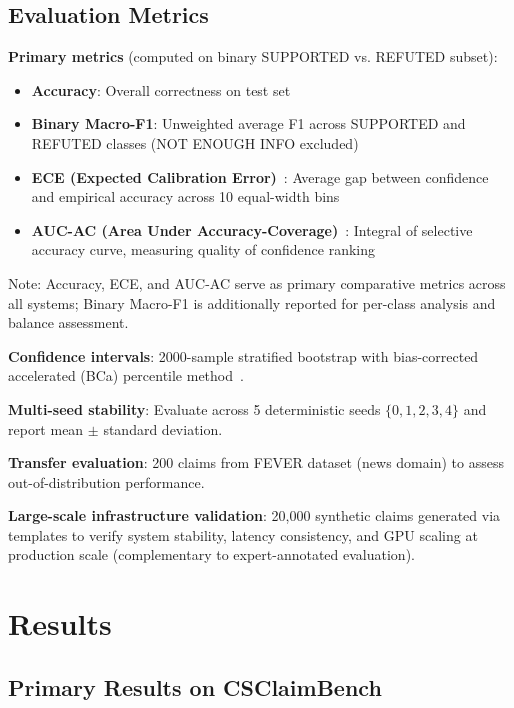 \documentclass[journal]{IEEEtran}
\begin{document}
\subsection{Evaluation Metrics}

\textbf{Primary metrics} (computed on binary SUPPORTED vs. REFUTED subset):
\begin{itemize}
    \item \textbf{Accuracy}: Overall correctness on test set
    \item \textbf{Binary Macro-F1}: Unweighted average F1 across SUPPORTED and REFUTED classes (NOT ENOUGH INFO excluded)
    \item \textbf{ECE (Expected Calibration Error)}~\cite{Naeini2015}: Average gap between confidence and empirical accuracy across 10 equal-width bins
    \item \textbf{AUC-AC (Area Under Accuracy-Coverage)}~\cite{Geifman2019}: Integral of selective accuracy curve, measuring quality of confidence ranking
\end{itemize}

Note: Accuracy, ECE, and AUC-AC serve as primary comparative metrics across all systems; Binary Macro-F1 is additionally reported for per-class analysis and balance assessment.

\textbf{Confidence intervals}: 2000-sample stratified bootstrap with bias-corrected accelerated (BCa) percentile method~\cite{Efron1994}.

\textbf{Multi-seed stability}: Evaluate across 5 deterministic seeds $\{0, 1, 2, 3, 4\}$ and report mean $\pm$ standard deviation.

\textbf{Transfer evaluation}: 200 claims from FEVER dataset (news domain) to assess out-of-distribution performance.

\textbf{Large-scale infrastructure validation}: 20,000 synthetic claims generated via templates to verify system stability, latency consistency, and GPU scaling at production scale (complementary to expert-annotated evaluation).


\section{Results}

\subsection{Primary Results on CSClaimBench}
\end{document}
